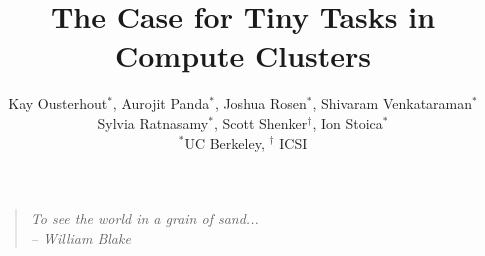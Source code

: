 \documentclass[pdftex,twoside,twocolumn,10pt,letterpaper]{article}
\begin{document}
\title{\large \bf The Case for Tiny Tasks in Compute Clusters}
\author{
{\rm Kay Ousterhout$^*$, Aurojit Panda$^*$, Joshua Rosen$^*$, Shivaram Venkataraman$^*$}\\
\rm{Sylvia Ratnasamy$^*$, Scott Shenker$^\dag$, Ion Stoica$^*$} \\
$^*$UC Berkeley, $^\dag$ ICSI
}
\date{\vspace{1in}}


\maketitle
\vspace{1in}

\begin{quote}
  \textit{To see the world in a grain of sand...}\\
  \textit{-- William Blake}
\end{quote}









\end{document}
